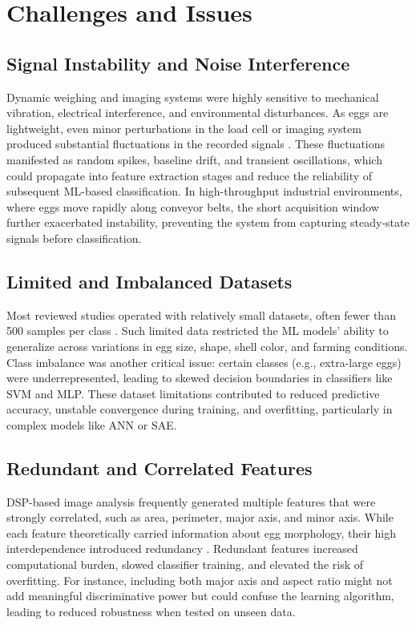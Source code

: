 \documentclass[conference]{IEEEtran}
\begin{document}
	\section{Challenges and Issues}
	
	\subsection{Signal Instability and Noise Interference}
	
	Dynamic weighing and imaging systems were highly sensitive to mechanical vibration, electrical interference, and environmental disturbances. As eggs are lightweight, even minor perturbations in the load cell or imaging system produced substantial fluctuations in the recorded signals \cite{yabanova2017}. These fluctuations manifested as random spikes, baseline drift, and transient oscillations, which could propagate into feature extraction stages and reduce the reliability of subsequent ML-based classification. In high-throughput industrial environments, where eggs move rapidly along conveyor belts, the short acquisition window further exacerbated instability, preventing the system from capturing steady-state signals before classification.
	
	\subsection{Limited and Imbalanced Datasets}
	
	Most reviewed studies operated with relatively small datasets, often fewer than 500 samples per class \cite{asadi2010}\cite{nasir2018}. Such limited data restricted the ML models’ ability to generalize across variations in egg size, shape, shell color, and farming conditions. Class imbalance was another critical issue: certain classes (e.g., extra-large eggs) were underrepresented, leading to skewed decision boundaries in classifiers like SVM and MLP. These dataset limitations contributed to reduced predictive accuracy, unstable convergence during training, and overfitting, particularly in complex models like ANN or SAE.
	
	\subsection{Redundant and Correlated Features}
	
	DSP-based image analysis frequently generated multiple features that were strongly correlated, such as area, perimeter, major axis, and minor axis. While each feature theoretically carried information about egg morphology, their high interdependence introduced redundancy \cite{soltani2015}. Redundant features increased computational burden, slowed classifier training, and elevated the risk of overfitting. For instance, including both major axis and aspect ratio might not add meaningful discriminative power but could confuse the learning algorithm, leading to reduced robustness when tested on unseen data.
	
\end{document}
